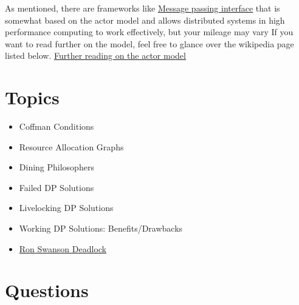 As mentioned, there are frameworks like \href{https://en.wikipedia.org/wiki/Message\_Passing\_Interface}{Message passing interface} that is somewhat based on the actor model and allows distributed systems in high performance computing to work effectively, but your mileage may vary
If you want to read further on the model, feel free to glance over the wikipedia page listed below.
\href{https://en.wikipedia.org/wiki/Actor\_model}{Further reading on the actor model}

\section{Topics}

\begin{itemize}
  \item Coffman Conditions
  \item Resource Allocation Graphs
  \item Dining Philosophers
  \item Failed DP Solutions
  \item Livelocking DP Solutions
  \item Working DP Solutions: Benefits/Drawbacks
  \item \href{http://adit.io/posts/2013-05-11-The-Dining-Philosophers-Problem-With-Ron-Swanson.html}{Ron Swanson Deadlock}
\end{itemize}

\section{Questions}

